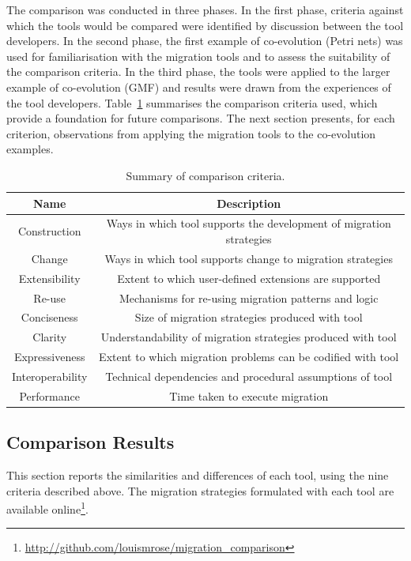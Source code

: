The comparison was conducted in three phases. In the first phase, criteria against which the tools would be compared were identified by discussion between the tool developers. In the second phase, the first example of co-evolution (Petri nets) was used for familiarisation with the migration tools and to assess the suitability of the comparison criteria. In the third phase, the tools were applied to the larger example of co-evolution (GMF) and results were drawn from the experiences of the tool developers. Table~\ref{tab:criteria} summarises the comparison criteria used, which provide a foundation for future comparisons. The next section presents, for each criterion, observations from applying the migration tools to the co-evolution examples.

\begin{table}[hbtp]
	\centering
	\caption{Summary of comparison criteria.}
	\label{tab:criteria}
	\begin{tabular}{|c|c|}
	\hline
	\textbf{Name}    & \textbf{Description} \\
	\hline
	Construction     & Ways in which tool supports the development of migration strategies \\
	\hline
	Change           & Ways in which tool supports change to migration strategies \\
	\hline
	Extensibility    & Extent to which user-defined extensions are supported \\
	\hline
	Re-use           & Mechanisms for re-using migration patterns and logic \\
	\hline
	Conciseness      & Size of migration strategies produced with tool \\
	\hline
	Clarity          & Understandability of migration strategies produced with tool \\
	\hline
	Expressiveness   & Extent to which migration problems can be codified with tool \\
	\hline
	Interoperability & Technical dependencies and procedural assumptions of tool \\
	\hline
	Performance      & Time taken to execute migration \\
	\hline
	\end{tabular}
\end{table}


\subsection{Comparison Results}
\label{sec:results}
This section reports the similarities and differences of each tool, using the nine criteria described above. The migration strategies formulated with each tool are available online\footnote{\url{http://github.com/louismrose/migration_comparison}}. 

